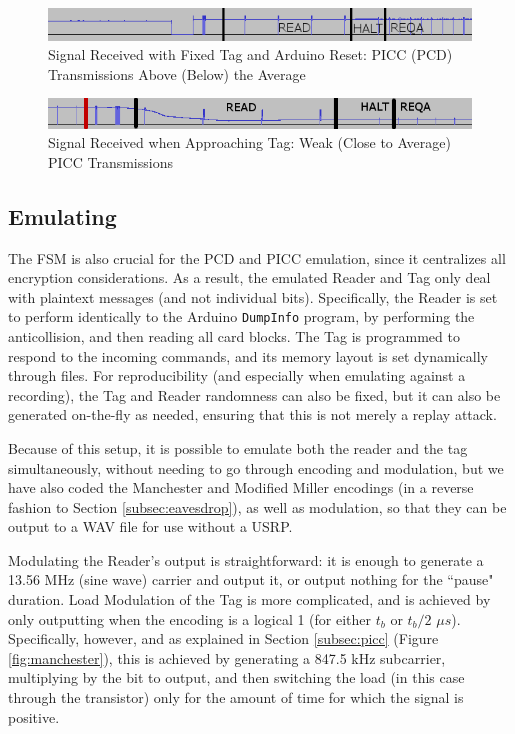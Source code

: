 \documentclass[fleqn,10pt]{SelfArx} %
\begin{document}
\begin{figure}[tp]
  \includegraphics[width=\linewidth]{img/usrpreset}
  \caption{Signal Received with Fixed Tag and Arduino Reset: PICC (PCD) Transmissions Above (Below) the Average}
  \label{fig:usrpreset}
\end{figure}

\begin{figure}[tp]
  \includegraphics[width=\linewidth]{img/usrpreal}
  \caption{Signal Received when Approaching Tag: Weak (Close to Average) PICC Transmissions}
  \label{fig:usrpreal}
\end{figure}


\subsection{Emulating}
\label{subsec:emulate}

The FSM is also crucial for the PCD and PICC emulation, since it centralizes all encryption considerations. As a result, the emulated Reader and Tag only deal with plaintext messages (and not individual bits). Specifically, the Reader is set to perform identically to the Arduino \texttt{DumpInfo} program, by performing the anticollision, and then reading all card blocks. The Tag is programmed to respond to the incoming commands, and its memory layout is set dynamically through files. For reproducibility (and especially when emulating against a recording), the Tag and Reader randomness can also be fixed, but it can also be generated on-the-fly as needed, ensuring that this is not merely a replay attack.

Because of this setup, it is possible to emulate both the reader and the tag simultaneously, without needing to go through encoding and modulation, but we have also coded the Manchester and Modified Miller encodings (in a reverse fashion to Section \ref{subsec:eavesdrop}), as well as modulation, so that they can be output to a WAV file for use without a USRP.

Modulating the Reader's output is straightforward: it is enough to generate a 13.56 MHz (sine wave) carrier and output it, or output nothing for the ``pause" duration. Load Modulation of the Tag is more complicated, and is achieved by only outputting when the encoding is a logical 1 (for either $t_b$ or $t_b/2$ $\mu s$). Specifically, however, and as explained in Section \ref{subsec:picc} (Figure \ref{fig:manchester}), this is achieved by generating a 847.5 kHz subcarrier, multiplying by the bit to output, and then switching the load (in this case through the transistor) only for the amount of time for which the signal is positive.
\end{document}
